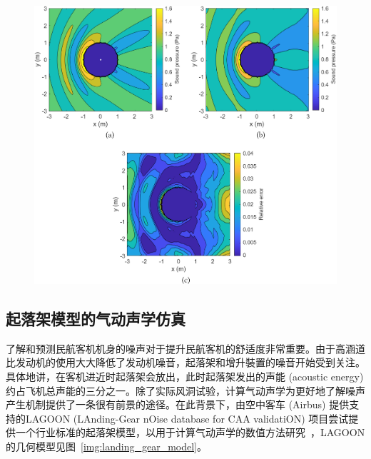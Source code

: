 \begin{figure}[!htbp]
  \centering
    \includegraphics[width=0.99\columnwidth]{figures/plane_wave_result.png}
  \label{img:plane_wave_result}
\end{figure}

\subsection{起落架模型的气动声学仿真}
了解和预测民航客机机身的噪声对于提升民航客机的舒适度非常重要。由于高涵道比发动机的使用大大降低了发动机噪音，起落架和增升裝置的噪音开始受到关注。具体地讲，在客机进近时起落架会放出，此时起落架发出的声能 (acoustic energy) 约占飞机总声能的三分之一。除了实际风洞试验，计算气动声学为更好地了解噪声产生机制提供了一条很有前景的途径。在此背景下，由空中客车 (Airbus) 提供支持的LAGOON (LAnding-Gear nOise database for CAA validatiON) 项目尝试提供一个行业标准的起落架模型，以用于计算气动声学的数值方法研究~\citep{doi:10.2514/6.2008-2816, doi:10.2514/6.2009-3277}，LAGOON的几何模型见图~\ref{img:landing_gear_model}。

